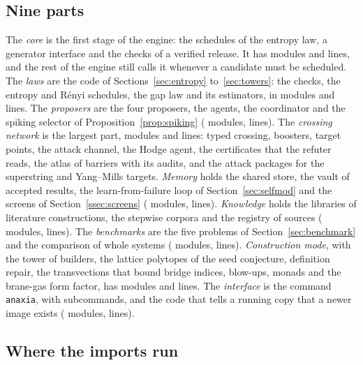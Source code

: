 \subsection{Nine parts}\label{ssec:parts}

The \emph{core} is the first stage of the engine: the schedules of the entropy law, a generator interface and the checks of a verified release. It has \brainModCore{} modules and \brainLocCore{} lines, and the rest of the engine still calls it whenever a candidate must be scheduled. The \emph{laws} are the code of Sections~\ref{sec:entropy} to~\ref{sec:towers}: the checks, the entropy and R\'enyi schedules, the gap law and its estimators, in \brainModLaws{} modules and \brainLocLaws{} lines. The \emph{proposers} are the four proposers, the agents, the coordinator and the spiking selector of Proposition~\ref{prop:spiking} (\brainModProposers{} modules, \brainLocProposers{} lines). The \emph{crossing network} is the largest part, \brainModCrossing{} modules and \brainLocCrossing{} lines: typed crossing, boosters, target points, the attack channel, the Hodge agent, the certificates that the refuter reads, the atlas of barriers with its audits, and the attack packages for the superstring and Yang--Mills targets. \emph{Memory} holds the shared store, the vault of accepted results, the learn-from-failure loop of Section~\ref{sec:selfmod} and the screens of Section~\ref{ssec:screens} (\brainModMemory{} modules, \brainLocMemory{} lines). \emph{Knowledge} holds the libraries of literature constructions, the stepwise corpora and the registry of sources (\brainModKnowledge{} modules, \brainLocKnowledge{} lines). The \emph{benchmarks} are the five problems of Section~\ref{sec:benchmark} and the comparison of whole systems (\brainModBenchmarks{} modules, \brainLocBenchmarks{} lines). \emph{Construction mode}, with the tower of builders, the lattice polytopes of the seed conjecture, definition repair, the transvections that bound bridge indices, blow-ups, monads and the brane-gas form factor, has \brainModConstruction{} modules and \brainLocConstruction{} lines. The \emph{interface} is the command \texttt{anaxia}, with \brainCommands{} subcommands, and the code that tells a running copy that a newer image exists (\brainModInterface{} modules, \brainLocInterface{} lines).

\subsection{Where the imports run}

